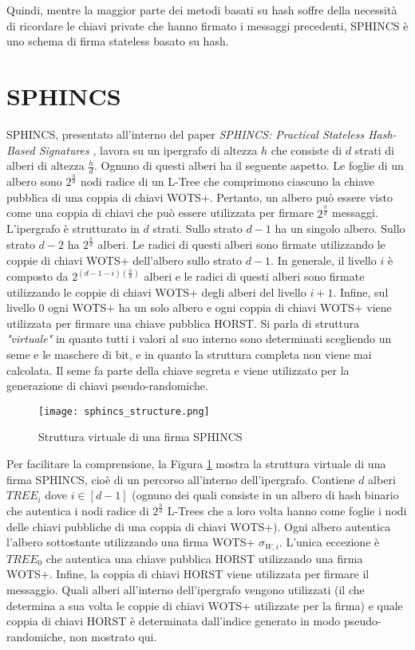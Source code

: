 Quindi, mentre la maggior parte dei metodi basati su hash soffre della necessità di ricordare le chiavi private che hanno firmato i messaggi precedenti, SPHINCS è uno schema di firma stateless basato su hash.

\section{SPHINCS}
SPHINCS, presentato all'interno del paper \textit{SPHINCS: Practical Stateless Hash-Based Signatures} \cite{SPHINCS}, lavora su un ipergrafo di altezza \(h\) che consiste di \(d\) strati di alberi di altezza \(\frac{h}{d}\). Ognuno di questi alberi ha il seguente aspetto. Le foglie di un albero sono \(2^{\frac{h}{d}}\) nodi radice di un L-Tree che comprimono ciascuno la chiave pubblica di una coppia di chiavi WOTS+. Pertanto, un albero può essere visto come una coppia di chiavi che può essere utilizzata per firmare \(2^{\frac{h}{d}}\) messaggi. L'ipergrafo è strutturato in \(d\) strati. Sullo strato \(d - 1\) ha un singolo albero. Sullo strato \(d - 2\) ha \(2^{\frac{h}{d}}\) alberi. Le radici di questi alberi sono firmate utilizzando le coppie di chiavi WOTS+ dell'albero sullo strato \(d - 1\). In generale, il livello \(i\) è composto da \(2^{(d-1-i)(\frac{h}{d})}\) alberi e le radici di questi alberi sono firmate utilizzando le coppie di chiavi WOTS+ degli alberi del livello \(i + 1\). Infine, sul livello 0 ogni WOTS+ ha un solo albero e ogni coppia di chiavi WOTS+ viene utilizzata per firmare una chiave pubblica HORST. Si parla di struttura \textit{"virtuale"} in quanto tutti i valori al suo interno sono determinati scegliendo un seme e le maschere di bit, e in quanto la struttura completa non viene mai calcolata. Il seme fa parte della chiave segreta e viene utilizzato per la generazione di chiavi pseudo-randomiche.

\begin{figure}[h]
  \centering
  \texttt{[image: sphincs\_structure.png]}
  \caption{Struttura virtuale di una firma SPHINCS}
  \label{fig:sphincs_structure}
\end{figure}

Per facilitare la comprensione, la Figura \ref{fig:sphincs_structure} mostra la struttura virtuale di una firma SPHINCS, cioè di un percorso all'interno dell'ipergrafo. Contiene \(d\) alberi \(TREE_i\) dove \(i \in [d - 1]\) (ognuno dei quali consiste in un albero di hash binario che autentica i nodi radice di \(2^{\frac{h}{d}}\) L-Trees che a loro volta hanno come foglie i nodi delle chiavi pubbliche di una coppia di chiavi WOTS+). Ogni albero autentica l'albero sottostante utilizzando una firma WOTS+ \(\sigma_{W,i}\). L'unica eccezione è \(TREE_0\) che autentica una chiave pubblica HORST utilizzando una firma WOTS+. Infine, la coppia di chiavi HORST viene utilizzata per firmare il messaggio. Quali alberi all'interno dell'ipergrafo vengono utilizzati (il che determina a sua volta le coppie di chiavi WOTS+ utilizzate per la firma) e quale coppia di chiavi HORST è determinata dall'indice generato in modo pseudo-randomiche, non mostrato qui.

